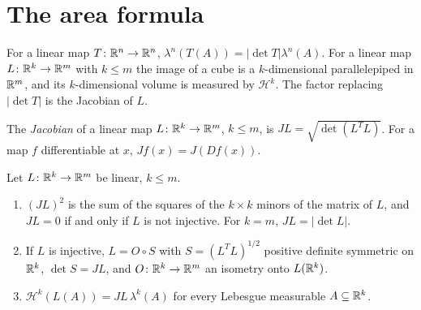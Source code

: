 \section{The area formula}\label{measure-theory:section-area-formula}

For a linear map $T \colon \mathbb{R}^n \to \mathbb{R}^n$, $\lambda^n(T(A)) = |\det T|\lambda^n(A)$. For a linear map $L \colon \mathbb{R}^k \to \mathbb{R}^m$ with $k \leq m$ the image of a cube is a
$k$-dimensional parallelepiped in $\mathbb{R}^m$, and its $k$-dimensional volume is measured by $\mathcal{H}^k$. The factor replacing $|\det T|$ is the Jacobian of $L$.

\begin{definition}\label{measure-theory:definition-jacobian}
The \emph{Jacobian} of a linear map $L \colon \mathbb{R}^k \to \mathbb{R}^m$, $k \leq m$, is $JL = \sqrt{\det(L^TL)}$. For a map $f$ differentiable at $x$, $Jf(x) = J(Df(x))$.
\end{definition}

\begin{lemma}\label{measure-theory:lemma-jacobian}
Let $L \colon \mathbb{R}^k \to \mathbb{R}^m$ be linear, $k \leq m$.
\begin{enumerate}
\item $(JL)^2$ is the sum of the squares of the $k \times k$ minors of the matrix of $L$, and $JL = 0$ if and only if $L$ is not injective. For $k = m$, $JL = |\det L|$.
\item If $L$ is injective, $L = O \circ S$ with $S = (L^TL)^{1/2}$ positive definite symmetric on $\mathbb{R}^k$, $\det S = JL$, and $O \colon \mathbb{R}^k \to \mathbb{R}^m$ an isometry onto $L(\mathbb{R}^k)$.
\item $\mathcal{H}^k(L(A)) = JL\,\lambda^k(A)$ for every Lebesgue measurable $A \subseteq \mathbb{R}^k$.
\end{enumerate}
\end{lemma}


